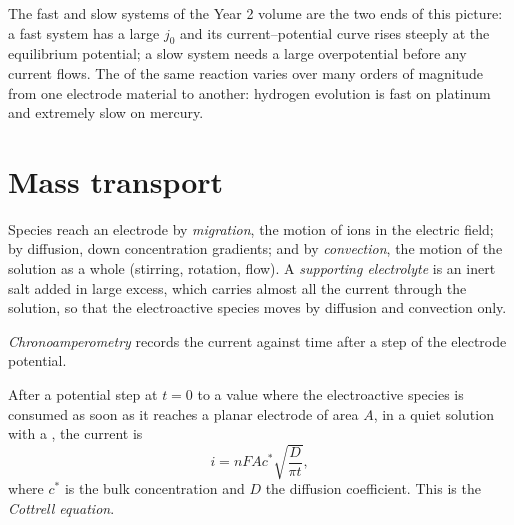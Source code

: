 The fast and slow systems of the Year 2 volume are the two ends of this
picture: a fast system has a large $j_0$ and its current--potential curve rises
steeply at the equilibrium potential; a slow system needs a large overpotential
before any current flows. The  of the same reaction
varies over many orders of magnitude from one electrode material to another:
hydrogen evolution is fast on platinum and extremely slow on mercury.

\section{Mass transport}

\begin{definition}\label{def:b3:electrode-kinetics:transport}
Species reach an electrode by \emph{migration}, the motion of ions
in the electric field; by diffusion, down concentration gradients; and by
\emph{convection}, the motion of the solution as a whole
(stirring, rotation, flow). A \emph{supporting electrolyte}
is an inert salt added in large excess, which carries almost all
the current through the solution, so that the electroactive species moves by
diffusion and convection only.
\end{definition}

\begin{definition}[Chronoamperometry]\label{def:b3:electrode-kinetics:chronoamperometry}
\emph{Chronoamperometry} records the current against time
after a step of the electrode potential.
\end{definition}

\begin{theorem}\label{thm:b3:electrode-kinetics:cottrell}
After a potential step at $t = 0$ to a value where the electroactive species is
consumed as soon as it reaches a planar electrode of area $A$, in a quiet
solution with a , the current is
\[
  i = nFAc^*\sqrt{\frac{D}{\pi t}},
\]
where $c^*$ is the bulk concentration and $D$ the diffusion coefficient. This is
the \emph{Cottrell equation}.
\end{theorem}

